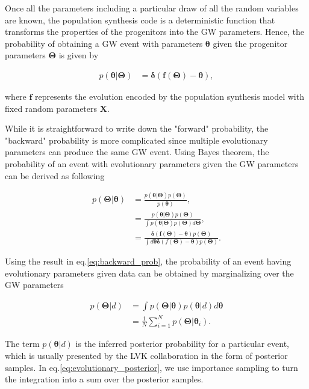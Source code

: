 \documentclass[twocolumn]{aastex631}
\begin{document}
Once all the parameters including a particular draw of all the random variables are known,
the population synthesis code is a deterministic function that transforms the properties of the progenitors into the GW parameters.
Hence, the probability of obtaining a GW event with parameters $\bm{\theta}$ given the progenitor parameters $\bm{\Theta}$ is given by

\begin{align}
    p(\bm{\theta}|\bm{\Theta}) &= \bm{\delta}(\bm{f}(\bm{\Theta})-\bm{\theta}),
\end{align}

where $\bm{f}$ represents the evolution encoded by the population synthesis model with fixed random parameters $\bm{X}$.

While it is straightforward to write down the "forward" probability, the "backward" probability is more complicated since multiple evolutionary parameters can produce the same GW event.
Using Bayes theorem, the probability of an event with evolutionary parameters given the GW parameters can be derived as following

\begin{align}
    p(\bm{\Theta}|\bm{\theta}) &= \frac{p(\bm{\theta}|\bm{\Theta})p(\bm{\Theta})}{p(\bm{\theta})}, \nonumber \\
    &= \frac{p(\bm{\theta}|\bm{\Theta})p(\bm{\Theta})}{\int p(\bm{\theta}|\bm{\Theta}) p(\bm{\Theta}) d\bm{\Theta}}, \nonumber \\
    &= \frac{\bm{\delta}(\bm{f}(\bm{\Theta})-\bm{\theta})p(\bm{\Theta})}{\int d\bm{\theta} \bm{\delta}(f(\bm{\Theta})-\bm{\theta})p(\bm{\Theta})}.
\label{eq:backward_prob}
\end{align}

Using the result in eq.\ref{eq:backward_prob},
the probability of an event having evolutionary parameters given data can be obtained by marginalizing over the GW parameters

\begin{align}
    p(\bm{\Theta}|d) &= \int p(\bm{\Theta}|\bm{\theta}) p(\bm{\theta}|d) d\bm{\theta}\\
    &= \frac{1}{N}\sum_{i=1}^{N} p(\bm{\Theta}|\bm{\theta}_i). \label{eq:evolutionary_posterior}
\end{align}

The term $p(\bm{\theta}|d)$ is the inferred posterior probability for a particular event, which is usually presented by the LVK collaboration in the form of posterior samples.
In eq.\ref{eq:evolutionary_posterior}, we use importance sampling to turn the integration into a sum over the posterior samples.
\end{document}
